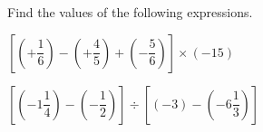  Find the values of the following expressions.

\begin{subparts}
  \item $\left[\left(+\dfrac{1}{6}\right)-\left(+\dfrac{4}{5}\right)+\left(-\dfrac{5}{6}\right)\right]\times(-15)$

  \item $\left[\left(-1\dfrac{1}{4}\right)-\left(-\dfrac{1}{2}\right)\right]\div\left[(-3)-\left(-6\dfrac{1}{3}\right)\right]$
\end{subparts}

